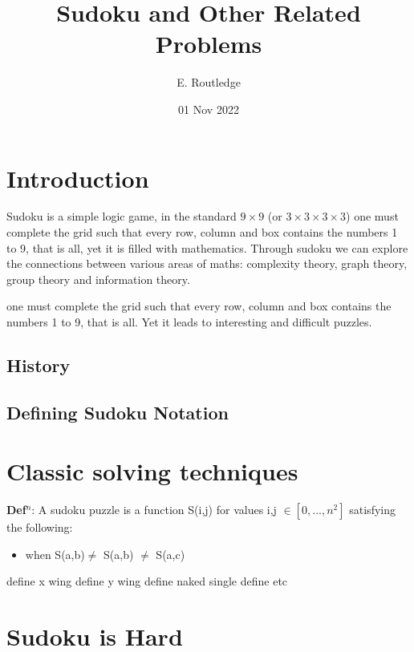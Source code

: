 \documentclass[a4paper,12pt]{article}
\author{E. Routledge}
\date{01 Nov 2022}
\title{Sudoku and Other Related Problems}
\begin{document}
\lstset{language=Python}
\maketitle

\section{Introduction}
		Sudoku is a simple logic game, in the standard $9 \times 9$ (or $3 \times 3 \times 3 \times 3$) 
		one must complete the grid such that every row, column and box contains the numbers 1 to 9, that is all,
		yet it is filled with mathematics. Through sudoku we can explore the connections between various areas of maths: complexity theory, graph theory, group theory and information theory.

		one must complete the grid such that every row, column and box contains the numbers 1 to 9, that is all. 
		Yet it leads to interesting and difficult puzzles.
	\subsection{History}
	
	\subsection{Defining Sudoku Notation}
\section{Classic solving techniques}
\textbf{Def$^n$}: A sudoku puzzle is a function S(i,j) for values i,j $\in [0,...,n^2]$ satisfying the following:
\begin{itemize}
	\item{when S(a,b)$\neq$ S(a,b) $\neq$ S(a,c) }
\end{itemize}


define x wing
define y wing
define naked single
define etc
\section{Sudoku is Hard}
\end{document}
